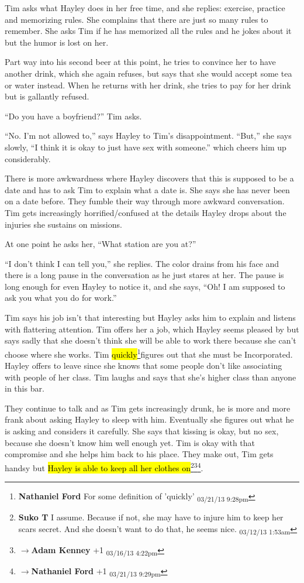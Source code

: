 Tim asks what Hayley does in her free time, and she replies: exercise, practice and memorizing rules.  She complains that there are just so many rules to remember.  She asks Tim if he has memorized all the rules and he jokes about it but the humor is lost on her.



Part way into his second beer at this point, he tries to convince her to have another drink, which she again refuses, but says that she would accept some tea or water instead.  When he returns with her drink, she tries to pay for her drink but is gallantly refused.

``Do you have a boyfriend?'' Tim asks.

``No.  I'm not allowed to,'' says Hayley to Tim's disappointment.  ``But,'' she says slowly, ``I think it is okay to just have sex with someone.'' which cheers him up considerably.

There is more awkwardness where Hayley discovers that this is supposed to be a date and has to ask Tim to explain what a date is.  She says she has never been on a date before.  They fumble their way through more awkward conversation.  Tim gets increasingly horrified/confused at the details Hayley drops about the injuries she sustains on missions.  

At one point he asks her, ``What station are you at?''

``I don't think I can tell you,'' she replies.  The color drains from his face and there is a long pause in the conversation as he just stares at her.  The pause is long enough for even Hayley to notice it, and she says, ``Oh!  I am supposed to ask you what you do for work.''



Tim says his job isn't that interesting but Hayley asks him to explain and listens with flattering attention.  Tim offers her a job, which Hayley seems pleased by but says sadly that she doesn't think she will be able to work there because she can't choose where she works.  Tim \hl{quickly}\footnote{\textbf{Nathaniel Ford }For some definition of 'quickly' \textsubscript{03/21/13 9:28pm}}figures out that she must be Incorporated.  Hayley offers to leave since she knows that some people don't like associating with people of her class.   Tim laughs and says that she's higher class than anyone in this bar.



They continue to talk and as Tim gets increasingly drunk, he is more and more frank about asking Hayley to sleep with him.  Eventually she figures out what he is asking and considers it carefully.  She says that kissing is okay, but no sex, because she doesn't know him well enough yet.  Tim is okay with that compromise and she helps him back to his place.  They make out, Tim gets handsy but \hl{Hayley is able to keep all her clothes on}\footnote{\textbf{Suko T }I assume.  Because if not, she may have to injure him to keep her scars secret.  And she doesn't want to do that, he seems nice. \textsubscript{03/12/13 1:53am}}\footnote{$\rightarrow$\textbf{Adam Kenney }+1 \textsubscript{03/16/13 4:22pm}}\footnote{$\rightarrow$\textbf{Nathaniel Ford }+1 \textsubscript{03/21/13 9:29pm}}.



